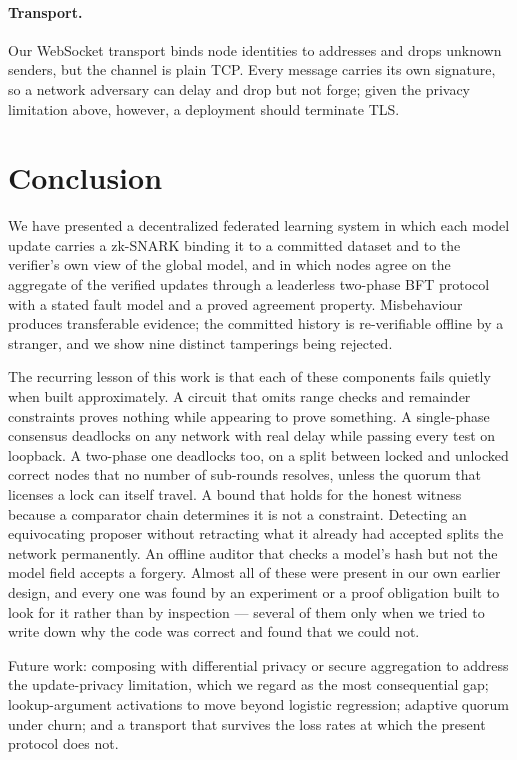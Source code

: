 \documentclass{llncs}
\begin{document}
\paragraph{Transport.}
Our WebSocket transport binds node identities to addresses and drops unknown
senders, but the channel is plain TCP. Every message carries its own signature,
so a network adversary can delay and drop but not forge; given the privacy
limitation above, however, a deployment should terminate TLS.

\section{Conclusion}

We have presented a decentralized federated learning system in which each model
update carries a zk-SNARK binding it to a committed dataset and to the verifier's
own view of the global model, and in which nodes agree on the aggregate of the
verified updates through a leaderless two-phase BFT protocol with a stated fault
model and a proved agreement property. Misbehaviour produces transferable
evidence; the committed history is re-verifiable offline by a stranger, and we
show nine distinct tamperings being rejected.

The recurring lesson of this work is that each of these components fails quietly
when built approximately. A circuit that omits range checks and remainder
constraints proves nothing while appearing to prove something. A single-phase
consensus deadlocks on any network with real delay while passing every test on
loopback. A two-phase one deadlocks too, on a split between locked and unlocked
correct nodes that no number of sub-rounds resolves, unless the quorum that
licenses a lock can itself travel. A bound that holds for the honest witness
because a comparator chain determines it is not a constraint. Detecting an
equivocating proposer without retracting what it already had accepted splits the
network permanently. An offline auditor that checks a model's hash but not the
model field accepts a forgery. Almost all of these were present in our own
earlier design, and every one was found by an experiment or a proof obligation
built to look for it rather than by inspection --- several of them only when we
tried to write down why the code was correct and found that we could not.

Future work: composing with differential privacy or secure aggregation to
address the update-privacy limitation, which we regard as the most consequential
gap; lookup-argument activations to move beyond logistic regression; adaptive
quorum under churn; and a transport that survives the loss rates at which the
present protocol does not.



\end{document}
